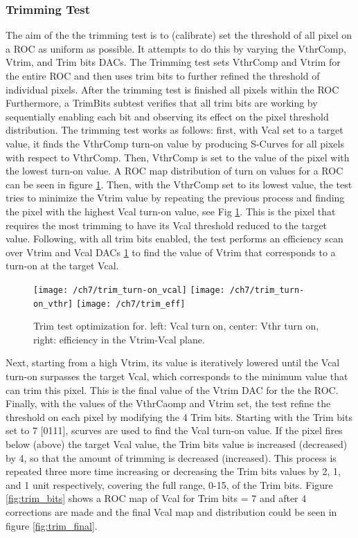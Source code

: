 \subsubsection{Trimming Test}
The aim of the the trimming test is to (calibrate) set the threshold of all pixel on a ROC as uniform as possible. It attempts to do this by varying the VthrComp, Vtrim, and Trim bits DACs. The Trimming test sets VthrComp and Vtrim for the entire ROC and then uses trim bits to further refined the threshold of individual pixels. After the trimming test is finished all pixels within the ROC {}  Furthermore, a TrimBits subtest verifies that all trim bits are working by sequentially enabling each bit and observing its effect on the pixel threshold distribution. The trimming test works as follows: first, with Vcal set to a target value, it finds the VthrComp turn-on value by producing S-Curves for all pixels with respect to VthrComp. Then, VthrComp is set to the value of the pixel with the lowest turn-on value. A ROC map distribution of turn on values for a ROC can be seen in figure \ref{fig:turn-on}. Then, with the VthrComp set to its lowest value, the test tries to minimize the Vtrim value by repeating the previous process and finding the pixel with the highest Vcal turn-on value, see Fig \ref{fig:turn-on}. This is the pixel that requires the most trimming to have its Vcal threshold reduced to the target value. Following, with all trim bits enabled, the test performs an efficiency scan over Vtrim and Vcal DACs \ref{fig:turn-on} to find the value of Vtrim that corresponds to a turn-on at the target Vcal.

\begin{figure}[!h]
  \centering
  \texttt{[image: /ch7/trim\_turn-on\_vcal]}
  \texttt{[image: /ch7/trim\_turn-on\_vthr]}
  \texttt{[image: /ch7/trim\_eff]}
  \caption[Trim test turn on]{Trim test optimization for. left: Vcal turn on, center: Vthr turn on, right: efficiency in the Vtrim-Vcal plane.}\label{fig:turn-on}
\end{figure}

Next, starting from a high Vtrim, its value is iteratively lowered until the Vcal turn-on surpasses the target Vcal, which corresponds to the minimum value that can trim this pixel. This is the final value of the Vtrim DAC for the the ROC. Finally, with the values of the VthrCaomp and Vtrim set, the test refine the threshold on each pixel by modifying the 4 Trim bits. Starting with the Trim bits set to 7 [0111],    scurves are used to find the Vcal turn-on value. If the pixel {} fires below (above) the target Vcal value, the Trim bits value is increased (decreased) by 4, so that the amount of trimming is decreased (increased). This process is repeated three more time increasing or decreasing the Trim bits values by 2, 1, and 1 unit respectively, covering the full range, 0-15, of the Trim bits. Figure \ref{fig:trim_bits} shows a ROC map of Vcal for Trim bits = 7 and after 4 corrections are made and the final Vcal map and distribution could be seen in figure \ref{fig:trim_final}. 

